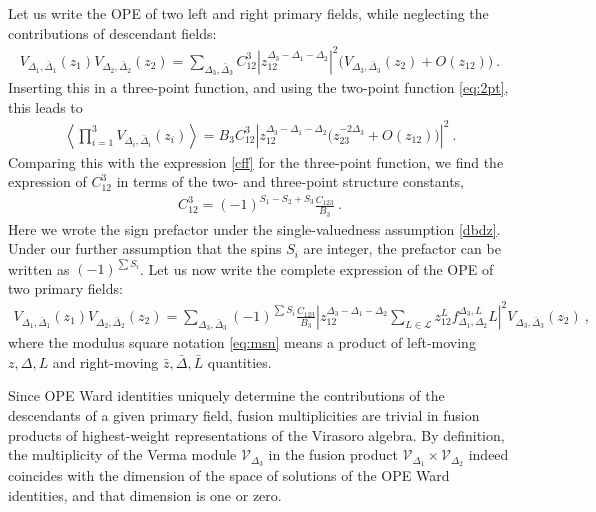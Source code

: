 \documentclass[12pt, a4paper, notitlepage, twoside]{report}
\numberwithin{equation}{section}
\theoremstyle{break}
\begin{document}
Let us write the OPE of two left and right primary fields, while neglecting the contributions of descendant fields:
\begin{align}
 V_{\Delta_1,\bar\Delta_1}(z_1) V_{\Delta_2,\bar\Delta_2}(z_2) 
 = 
 \sum_{\Delta_3,\bar\Delta_3} C^{3}_{12}
 \left| z_{12}^{\Delta_3-\Delta_1-\Delta_2}\right|^2 \Big( V_{\Delta_3,\bar\Delta_3}(z_2) + O(z_{12})\Big)\ .
\end{align}
Inserting this in a three-point function, and using the two-point function \eqref{eq:2pt}, this leads to
\begin{align}
 \left<  \prod_{i=1}^3 V_{\Delta_i,\bar\Delta_i}(z_i) \right> 
 = 
 B_3C^3_{12} \left| z_{12}^{\Delta_3-\Delta_1-\Delta_2} \Big( z_{23}^{-2\Delta_3} + O(z_{12}) \Big) \right|^2\ .
\end{align}
Comparing this with the expression \eqref{cff} for the three-point function, we find the expression of  $C^3_{12}$ in terms of the two- and three-point structure constants, 
\begin{align}
 C^3_{12}= (-1)^{S_1-S_2+S_3}\frac{C_{123}}{B_3}\ .
 \label{cftt}
\end{align}
Here we wrote the sign prefactor under the single-valuedness assumption \eqref{dbdz}. Under our further assumption that the spins $S_i$ are integer, the prefactor can be written as $(-1)^{\sum S_i}$.  
Let us now write the complete expression of the OPE of two primary fields:
\begin{align}
 \boxed{ V_{\Delta_1,\bar\Delta_1}(z_1) V_{\Delta_2,\bar\Delta_2}(z_2) 
 = 
 \sum_{\Delta_3,\bar\Delta_3} (-1)^{\sum S_i}\frac{C_{123}}{B_3} \left| z_{12}^{\Delta_3-\Delta_1-\Delta_2}\sum_{L\in\mathcal{L}} z_{12}^Lf^{\Delta_3,L}_{\Delta_1,\Delta_2} L \right|^2 V_{\Delta_3,\bar\Delta_3}(z_2)
 }\ ,
 \label{vvs}
\end{align}
where  the modulus square notation \eqref{eq:msn} means a product of left-moving $z,\Delta,L$ and right-moving $\bar z, \bar \Delta, \bar L$ quantities.

Since OPE Ward identities uniquely determine the contributions of the descendants of a given primary field, fusion multiplicities are trivial in fusion products of highest-weight representations of the Virasoro algebra. By definition, the multiplicity of the Verma module $\mathcal{V}_{\Delta_3}$ in the fusion product $\mathcal{V}_{\Delta_1}\times \mathcal{V}_{\Delta_2}$ indeed coincides with the dimension of the space of solutions of the OPE Ward identities, and that dimension is one or zero.
\end{document}
